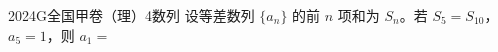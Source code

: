 
\begin{problem}{2024}{G}{全国甲卷（理）}{4}{数列}
设等差数列 $\{a_n\}$ 的前 $n$ 项和为 $S_n$。若 $S_5=S_{10}$，$a_5=1$，则 $a_1=$
\begin{choices}
\end{choices}
\end{problem}